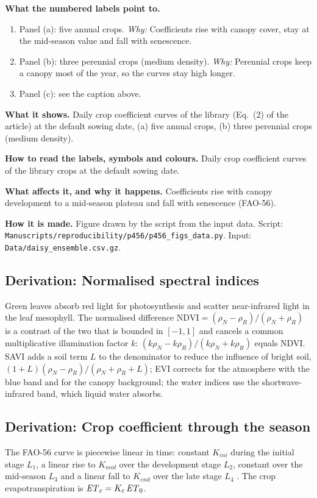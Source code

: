 \textbf{What the numbered labels point to.}
\begin{enumerate}[nosep,label=\protect\circled{\arabic*}]
\item Panel (a): five annual crops. \emph{Why:} Coefficients rise with canopy cover, stay at the mid-season value and fall with senescence.
\item Panel (b): three perennial crops (medium density). \emph{Why:} Perennial crops keep a canopy most of the year, so the curves stay high longer.
\item Panel (c): see the caption above.
\end{enumerate}

\textbf{What it shows.} Daily crop coefficient curves of the library (Eq.~(2) of the article) at the default sowing date, (a) five annual crops, (b) three perennial crops (medium density).

\textbf{How to read the labels, symbols and colours.} Daily crop coefficient curves of the library crops at the default sowing date.

\textbf{What affects it, and why it happens.} Coefficients rise with canopy development to a mid-season plateau and fall with senescence (FAO-56).

\textbf{How it is made.} Figure drawn by the script from the input data. Script: \nolinkurl{Manuscripts/reproducibility/p456/p456_figs_data.py}. Input: \nolinkurl{Data/daisy_ensemble.csv.gz}.

\subsection{Derivation: Normalised spectral indices}\label{der:s3:1}
Green leaves absorb red light for photosynthesis and scatter near-infrared light in the leaf mesophyll. The normalised difference $\mathrm{NDVI}=(\rho_N-\rho_R)/(\rho_N+\rho_R)$ is a contrast of the two that is bounded in $[-1,1]$ and cancels a common multiplicative illumination factor $k$: $(k\rho_N-k\rho_R)/(k\rho_N+k\rho_R)$ equals NDVI. SAVI adds a soil term $L$ to the denominator to reduce the influence of bright soil, $(1+L)(\rho_N-\rho_R)/(\rho_N+\rho_R+L)$; EVI corrects for the atmosphere with the blue band and for the canopy background; the water indices use the shortwave-infrared band, which liquid water absorbs.


\subsection{Derivation: Crop coefficient through the season}\label{der:s3:2}
The FAO-56 curve is piecewise linear in time: constant $K_{ini}$ during the initial stage $L_1$, a linear rise to $K_{mid}$ over the development stage $L_2$, constant over the mid-season $L_3$ and a linear fall to $K_{end}$ over the late stage $L_4$ \citep{Allen1998}. The crop evapotranspiration is $\mathit{ET}_c=K_c\,\mathit{ET}_0$.


